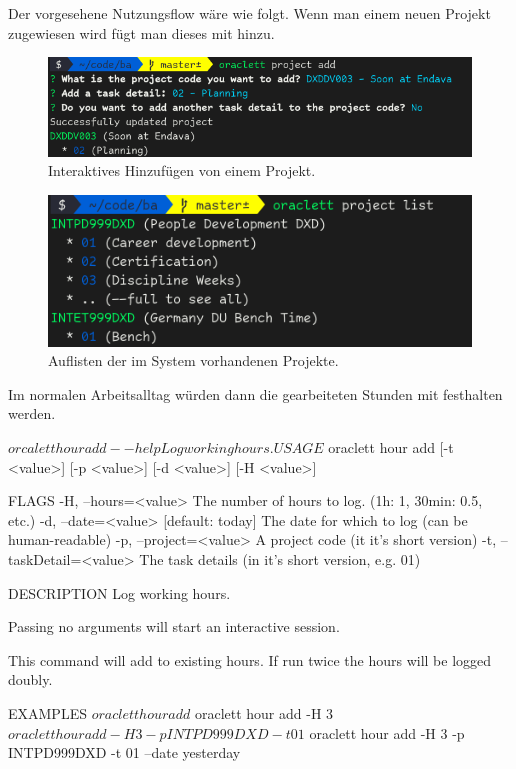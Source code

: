 \documentclass[oneside,bibliography=totocnumbered,BCOR=5mm]{scrbook}
\newenvironment{code}{\captionsetup{type=listing, skip=0pt}}{}
\begin{document}
Der vorgesehene Nutzungsflow wäre wie folgt. Wenn man einem neuen Projekt
zugewiesen wird fügt man dieses  mit  hinzu.

\begin{figure}[H]
  \centering
  \includegraphics[scale=0.5]{project-add.png}
  \caption{Interaktives Hinzufügen von einem Projekt.}
  \label{fig:project-add}
\end{figure}

\begin{figure}[H]
  \centering
  \includegraphics[scale=0.5]{project-list.png}
  \caption{Auflisten der im System vorhandenen Projekte.}
  \label{fig:project-list}
\end{figure}

Im normalen Arbeitsalltag würden dann die gearbeiteten Stunden mit
 festhalten werden.

\begin{code}
  \begin{shellcode}
$ orcalett hour add --help
  Log working hours.

USAGE
  $ oraclett hour add [-t <value>] [-p <value>] [-d <value>] [-H
    <value>]

FLAGS
  -H, --hours=<value>       The number of hours to log. (1h: 1, 30min: 0.5,
                            etc.)
  -d, --date=<value>        [default: today] The date for which to log (can be
                            human-readable)
  -p, --project=<value>     A project code (it it's short version)
  -t, --taskDetail=<value>  The task details (in it's short version, e.g. 01)

DESCRIPTION
  Log working hours.

  Passing no arguments will start an interactive session.

  This command will add to existing hours. If run twice the hours will be
  logged doubly.

EXAMPLES
  $ oraclett hour add
  $ oraclett hour add -H 3
  $ oraclett hour add -H 3 -p INTPD999DXD -t 01
  $ oraclett hour add -H 3 -p INTPD999DXD -t 01 --date yesterday
  \end{shellcode}
  \medskip
\end{code}
\end{document}
